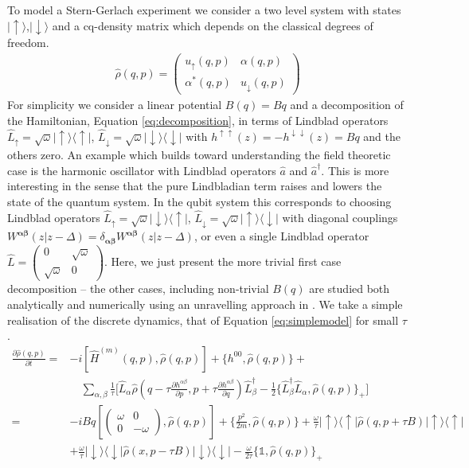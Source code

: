 \documentclass[aps,pra,showpacs,citeautoscript,amsmath,amssymb,floatfix,superscriptaddress,bbm, verbatim,amsfonts,changes,11pt,nofootinbib,longbibliography]{revtex4-2}
\newcommand{\id}{\mathbb{1}}
\newcommand{\ag}{{\boldsymbol\alpha}}
\newcommand{\bg}{{\boldsymbol\beta}}
\newcommand{\ket}[1]{|#1\rangle}
\newcommand{\bra}[1]{\langle#1|}
\newcommand{\proj}[1]{|#1\rangle\!\langle#1|}
\def\z{{z}}
\def\L{{\hat{L}}}
\def\Hqm{\hat{H}^{(m)}}
\def\dist{{\Delta}}
\def\rate{{W}}
\renewcommand{\varrho}{\hat{\rho}}
\def\down{\downarrow}
\def\up{\uparrow}
\def\PB{\}}
\def\bfa{\hat{a}}
\begin{document}
To model a Stern-Gerlach experiment we consider a two level system with states $\ket{\up}$,$\ket{\down}$ and a cq-density matrix which depends on the classical degrees of freedom.
\begin{align}
\varrho(q,p)=
\begin{pmatrix} u_\up(q,p) & \alpha(q,p)\\ \alpha^*(q,p) & u_\down(q,p)\end{pmatrix}
\label{eq:cqQubit}
\end{align}
For simplicity we consider a linear potential $B(q)=Bq$ and a decomposition of the Hamiltonian, Equation \eqref{eq:decomposition}, in terms of Lindblad operators 
 $\L_\up=\sqrt{\omega}\ket{\up}\bra{\up}$, $\L_{\down}=\sqrt{\omega}\ket{\down}\bra{\down}$ with $h^{\up\up}(\z)=-h^{\down\down}(\z)=Bq$ and the others zero.
An example which builds toward understanding the field theoretic case is the harmonic oscillator with Lindblad operators $\bfa$ and $\bfa^\dagger$. This is more interesting in the sense that the pure Lindbladian term raises and lowers the state of the quantum system. In the qubit system this corresponds to choosing Lindblad operators
$\L_\up=\sqrt{\omega}\ket{\down}\bra{\up}$, $\L_{\down}=\sqrt{\omega}\ket{\up}\bra{\down}$ with diagonal couplings $\rate^{\ag\bg}(\z|\z-\dist)=\delta_{\ag\bg}\rate^{\ag\bg}(\z|\z-\dist)$, or even a single Lindblad operator
$\L=\begin{pmatrix} 0 & \sqrt{\omega}\\ \sqrt{\omega} & 0\end{pmatrix}$.
Here, we just present the more trivial first case decomposition -- the other cases, including non-trivial $B(q)$ are studied both analytically and numerically using an unravelling approach in  \cite{UCLqubit}.
We take a simple realisation of the discrete dynamics, that of Equation \eqref{eq:simplemodel} for small $\tau$.
%
\begin{align}
\frac{\partial\varrho(q,p)}{\partial t}
 =& -i[\Hqm(q,p),\varrho(q,p)]+\{h^{00},\varrho(q,p)\PB
+ \nonumber\\
& \quad\sum_{\alpha,\beta}
\frac{1}{\tau}\Big[
\L_\alpha 
\varrho(q-\tau\frac{\partial h^{\alpha\beta}}{\partial p},p+\tau\frac{\partial h^{\alpha\beta}}{\partial q})
 \L^\dagger_\beta
-\frac{1}{2}\{\L^\dagger_\beta\L_\alpha,\varrho(q,p)\}_+
\Big]
\nonumber
\\
=&
-iBq[\begin{pmatrix} \omega & 0\\ 0 & -\omega\end{pmatrix},\varrho(q,p)]
+\{\frac{p^2}{2m},\varrho(q,p)\PB
+
\frac{\omega}{\tau}
\proj{\up}\varrho(
q,p+\tau B)
 \proj{\up}
\nonumber\\ 
& 
+\frac{\omega}{\tau}\proj{\down}
\varrho(
x,p-\tau B)
 \proj{\down}
-\frac{\omega}{2\tau}\{
\id,\varrho(q,p)\}_+
\label{eq:qubitinpot}
\end{align}
\end{document}
